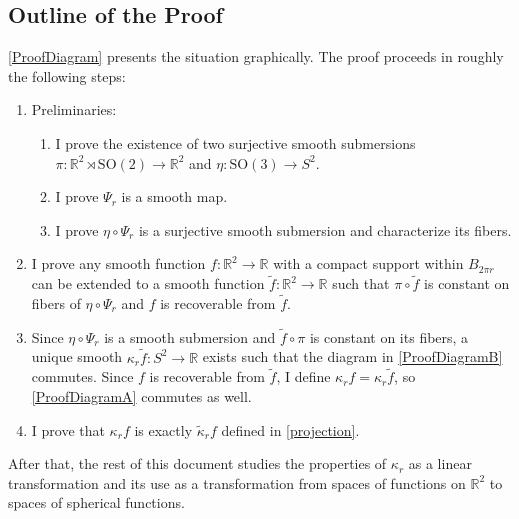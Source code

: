 \documentclass[a4paper,11pt]{scrartcl}
\numberwithin{dummy}{section}
\theoremstyle{plain}
\theoremstyle{plain}
\theoremstyle{plain}
\theoremstyle{plain}
\theoremstyle{nonumberplain}
\newcommand{\F}[1][R]{\mathbb{#1}} %
\newcommand{\SO}{\mathrm{SO}}
\begin{document}
	\subsection{Outline of the Proof}
	\autoref{ProofDiagram} presents the situation graphically. The proof proceeds in roughly the following steps:
	\begin{enumerate}
		\item Preliminaries:
		\begin{enumerate}
			\item \label{SubmersionStep} I prove the existence of two surjective smooth submersions $ \pi : \F^{2} \rtimes \SO(2) \to \F^{2} $ and $ \eta : \SO(3) \to S^{2} $.
			
			\item I prove $ \Psi_{r} $ is a smooth map.
			
			\item I prove $ \eta \circ \Psi_{r} $ is a surjective smooth submersion and characterize its fibers.
			
		\end{enumerate}
		
		\item I prove any smooth function $ f : \F^{2} \to \F $ with a compact support within $ B_{2 \pi r} $ can be extended to a smooth function $ \widetilde{f} : \F^{2} \to \F $ such that $ \pi \circ \widetilde{f} $ is constant on fibers of $ \eta \circ \Psi_{r} $ and $ f $ is recoverable from $ \widetilde{f} $.
		
		\item \label{LeeKeyStep} Since $ \eta \circ \Psi_{r} $ is a smooth submersion and $ \widetilde{f} \circ \pi $ is constant on its fibers, a unique smooth $ \kappa_{r} \widetilde{f} : S^{2} \to \F $ exists such that the diagram in \autoref{ProofDiagramB} commutes. Since $ f $ is recoverable from $ \widetilde{f} $, I define $ \kappa_{r} f = \kappa_{r} \widetilde{f} $, so \autoref{ProofDiagramA} commutes as well.
		
		\item I prove that $ \kappa_{r} f $ is exactly $ \widetilde{\kappa}_{r} f $ defined in \eqref{projection}.
		
	\end{enumerate}
	After that, the rest of this document studies the properties of $ \kappa_{r} $ as a linear transformation and its use as a transformation from spaces of functions on $ \F^{2} $ to spaces of spherical functions.
	
\end{document}
